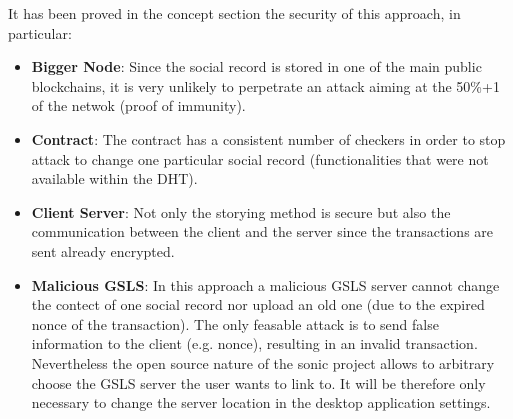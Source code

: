 It has been proved in the concept section the security of this approach, in particular:
\begin{itemize}
  \item \textbf{Bigger Node}: Since the social record is stored in one of the main public blockchains, it is very unlikely to perpetrate an attack aiming at the 50\%+1 of the netwok (proof of immunity).
  \item \textbf{Contract}: The contract has a consistent number of checkers in order to stop attack to change one particular social record (functionalities that were not available within the DHT).
  \item \textbf{Client Server}: Not only the storying method is secure but also the communication between the client and the server since the transactions are sent already encrypted.
  \item \textbf{Malicious GSLS}: In this approach a malicious GSLS server cannot change the contect of one social record nor upload an old one (due to the expired nonce of the transaction).
  The only feasable attack is to send false information to the client (e.g. nonce), resulting in an invalid transaction.
  Nevertheless the open source nature of the sonic project allows to arbitrary choose the GSLS server the user wants to link to.
  It will be therefore only necessary to change the server location in the desktop application settings.
\end{itemize}
